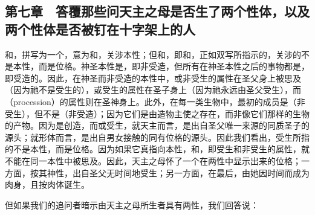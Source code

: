 
\subsection{第七章　答覆那些问天主之母是否生了两个性体，以及两个性体是否被钉在十字架上的人}

和，拼写为一个，意为和，关涉本性；但和，即和，正如双写所指示的，关涉的不是本性，而是位格。神圣本性是，即非受造，但所有在神圣本性之后的事物都是，即受造的。因此，在神圣而非受造的本性中，或非受生的属性在圣父身上被思及（因为祂不是受生的），或受生的属性在圣子身上（因为祂永远由圣父受生），而（procession）的属性则在圣神身上。此外，在每一类生物中，最初的成员是（非受生），但不是（非受造）；因为它们是由造物主使之存在，而非像它们那样的生物的产物。因为是创造，而或受生，就天主而言，是出自圣父唯一来源的同质圣子的源头；就形体而言，是出自男女接触的同有位格的源头。因此我们看出，受生所指的不是本性，而是位格。因为如果它真指向本性，和，即受生和非受生的属性，就不能在同一本性中被思及。因此，天主之母怀了一个在两性中显示出来的位格；一方面，按其神性，出自圣父无时间地受生；另一方面，在最后，由她因时间而成为肉身，且按肉体诞生。\par

但如果我们的追问者暗示由天主之母所生者具有两性，我们回答说：\par

